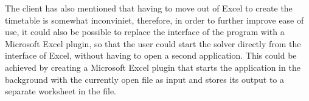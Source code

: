 \documentclass[a4paper, 12pt]{article}
\begin{document}
The client has also mentioned that having to move out of Excel to create the timetable is
somewhat inconviniet, therefore, in order to further improve ease of use, it could also be
possible to replace the interface of the program with a Microsoft Excel plugin, so that the
user could start the solver directly from the interface of Excel, without having to open a
second application. This could be achieved by creating a Microsoft Excel plugin that starts
the application in the background with the currently open file as input and stores its
output to a separate worksheet in the file.
\end{document}
